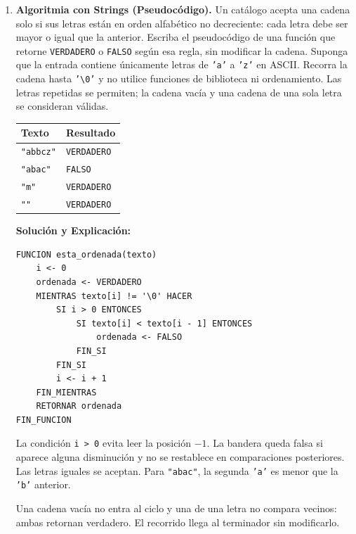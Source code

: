 \documentclass[11pt,letterpaper]{article}
\begin{document}
\begin{enumerate}[label=\textbf{\arabic*.}]
    \newpage
    \item \textbf{Algoritmia con Strings (Pseudocódigo).}
    Un catálogo acepta una cadena solo si sus letras están en orden alfabético no decreciente: cada letra debe ser mayor o igual que la anterior. Escriba el pseudocódigo de una función que retorne \texttt{VERDADERO} o \texttt{FALSO} según esa regla, sin modificar la cadena.
    Suponga que la entrada contiene únicamente letras de \texttt{'a'} a \texttt{'z'} en ASCII. Recorra la cadena hasta \texttt{'\textbackslash 0'} y no utilice funciones de biblioteca ni ordenamiento. Las letras repetidas se permiten; la cadena vacía y una cadena de una sola letra se consideran válidas.
    \begin{center}
    \begin{tabular}{ll}
    \toprule
    \textbf{Texto} & \textbf{Resultado} \\
    \midrule
    \texttt{"abbcz"} & \texttt{VERDADERO} \\
    \texttt{"abac"} & \texttt{FALSO} \\
    \texttt{"m"} & \texttt{VERDADERO} \\
    \texttt{""} & \texttt{VERDADERO} \\
    \bottomrule
    \end{tabular}
    \end{center}
    \begin{solucionbox}
    \textbf{Solución y Explicación:}
    \begin{lstlisting}[style=pseudocodigo]
FUNCION esta_ordenada(texto)
    i <- 0
    ordenada <- VERDADERO
    MIENTRAS texto[i] != '\0' HACER
        SI i > 0 ENTONCES
            SI texto[i] < texto[i - 1] ENTONCES
                ordenada <- FALSO
            FIN_SI
        FIN_SI
        i <- i + 1
    FIN_MIENTRAS
    RETORNAR ordenada
FIN_FUNCION
    \end{lstlisting}
    La condición \texttt{i > 0} evita leer la posición $-1$. La bandera queda falsa si aparece alguna disminución y no se restablece en comparaciones posteriores. Las letras iguales se aceptan. Para \texttt{"abac"}, la segunda \texttt{'a'} es menor que la \texttt{'b'} anterior.
    \par Una cadena vacía no entra al ciclo y una de una letra no compara vecinos: ambas retornan verdadero. El recorrido llega al terminador sin modificarlo.
    \end{solucionbox}


\end{enumerate}
\end{document}
